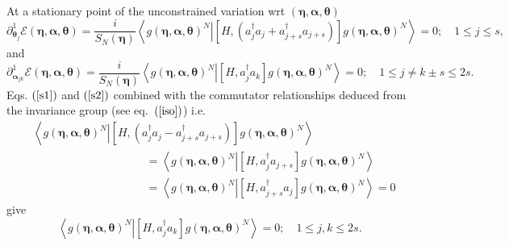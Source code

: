 \documentclass[aps,preprint]{revtex4}%
\begin{document}
At a stationary point of the unconstrained variation wrt $\left(
\mathbf{\eta},\mathbf{\alpha},\mathbf{\theta}\right)  $
\begin{equation}
\partial_{\mathbf{\theta}_{j}}^{1}\mathcal{E}\left(  \mathbf{\eta
},\mathbf{\alpha},\mathbf{\theta}\right)  =\frac{i}{S_{N}\left(  \mathbf{\eta
}\right)  }\left\langle \left.  g\left(  \mathbf{\eta},\mathbf{\alpha
},\mathbf{\theta}\right)  ^{N}\right\vert \left[  H,\left(  a_{j}^{\dagger
}a_{j}+a_{j+s}^{\dagger}a_{j+s}\right)  \right]  g\left(  \mathbf{\eta
},\mathbf{\alpha},\mathbf{\theta}\right)  ^{N}\right\rangle =0;\quad1\leq
j\leq s, \label{s1}%
\end{equation}
and%
\begin{equation}
\partial_{\mathbf{\alpha}_{jk}}^{1}\mathcal{E}\left(  \mathbf{\eta
},\mathbf{\alpha},\mathbf{\theta}\right)  =\frac{i}{S_{N}\left(  \mathbf{\eta
}\right)  }\left\langle \left.  g\left(  \mathbf{\eta},\mathbf{\alpha
},\mathbf{\theta}\right)  ^{N}\right\vert \left[  H,a_{j}^{\dagger}%
a_{k}\right]  g\left(  \mathbf{\eta},\mathbf{\alpha},\mathbf{\theta}\right)
^{N}\right\rangle =0;\quad1\leq j\neq k\pm s\leq2s. \label{s2}%
\end{equation}
Eqs. $\left(  \ref{s1}\right)  $ and $\left(  \ref{s2}\right)  $ combined with
the commutator relationships deduced from the invariance group (see
eq.\ $\left(  \ref{iso}\right)  $) i.e.\
\begin{align}
&  \left\langle \left.  g\left(  \mathbf{\eta},\mathbf{\alpha},\mathbf{\theta
}\right)  ^{N}\right\vert \left[  H,\left(  a_{j}^{\dagger}a_{j}%
-a_{j+s}^{\dagger}a_{j+s}\right)  \right]  g\left(  \mathbf{\eta
},\mathbf{\alpha},\mathbf{\theta}\right)  ^{N}\right\rangle \nonumber\\
&  \qquad\qquad\qquad\qquad\qquad\left.  =\right.  \left\langle \left.
g\left(  \mathbf{\eta},\mathbf{\alpha},\mathbf{\theta}\right)  ^{N}\right\vert
\left[  H,a_{j}^{\dagger}a_{j+s}\right]  g\left(  \mathbf{\eta},\mathbf{\alpha
},\mathbf{\theta}\right)  ^{N}\right\rangle \nonumber\\
&  \qquad\qquad\qquad\qquad\qquad\left.  =\right.  \left\langle \left.
g\left(  \mathbf{\eta},\mathbf{\alpha},\mathbf{\theta}\right)  ^{N}\right\vert
\left[  H,a_{j+s}^{\dagger}a_{j}\right]  g\left(  \mathbf{\eta},\mathbf{\alpha
},\mathbf{\theta}\right)  ^{N}\right\rangle \left.  =\right.  0
\end{align}
give
\begin{equation}
\left\langle \left.  g\left(  \mathbf{\eta},\mathbf{\alpha},\mathbf{\theta
}\right)  ^{N}\right\vert \left[  H,a_{j}^{\dagger}a_{k}\right]  g\left(
\mathbf{\eta},\mathbf{\alpha},\mathbf{\theta}\right)  ^{N}\right\rangle
=0;\quad1\leq j,k\leq2s. \label{s3}%
\end{equation}
\end{document}
